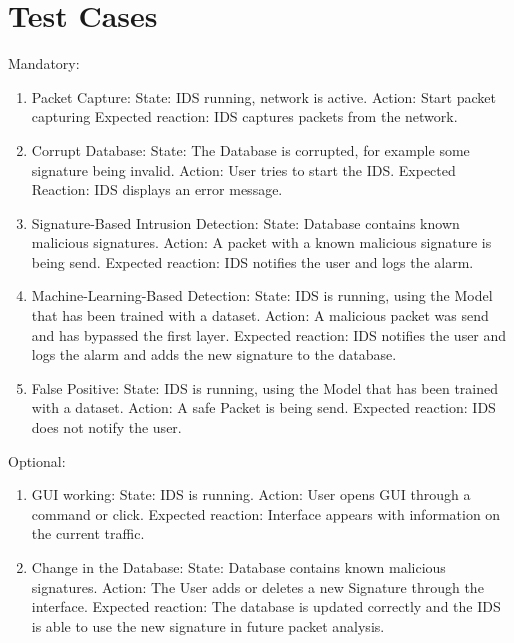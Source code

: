\documentclass[oneside, english]{reports/assets/sdqtechreport}
\begin{document}
\chapter{Test Cases}
\label{chap:TestCases}
Mandatory:
\begin{enumerate}
    \item Packet Capture:
State: IDS running, network is active.
Action: Start packet capturing
Expected reaction: IDS captures packets from the network.
    \item Corrupt Database:
State: The Database is corrupted, for example some signature being invalid.
Action: User tries to start the IDS.
Expected Reaction: IDS displays an error message.
    \item Signature-Based Intrusion Detection:
State: Database contains known malicious signatures.
Action: A packet with a known malicious signature is being send.
Expected reaction: IDS notifies the user and logs the alarm.
    \item Machine-Learning-Based Detection:
State: IDS is running, using the Model that has been trained with a dataset.
Action: A malicious packet was send and has bypassed the first layer.
Expected reaction: IDS notifies the user and logs the alarm and adds the new signature to the database.
    \item False Positive:
State: IDS is running, using the Model that has been trained with a dataset.
Action: A safe Packet is being send.
Expected reaction: IDS does not notify the user.
\end{enumerate}
Optional:
\begin{enumerate}
    \item GUI working:
State: IDS is running.
Action: User opens GUI through a command or click.
Expected reaction: Interface appears with information on the current traffic.
    \item Change in the Database:
State: Database contains known malicious signatures.
Action: The User adds or deletes a new Signature through the interface.
Expected reaction: The database is updated correctly and the IDS is able to use the new signature in future packet analysis.
\end{enumerate}
\end{document}

